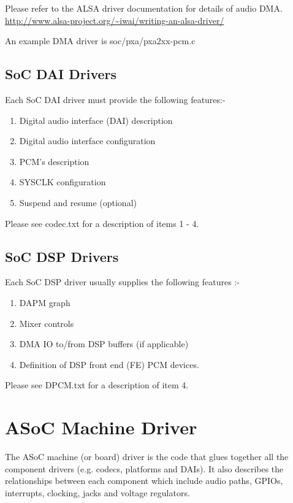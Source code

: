 \documentclass[a4paper,8pt,english]{sphinxmanual}
\begin{document}
Please refer to the ALSA driver documentation for details of audio DMA.
\href{http://www.alsa-project.org/~iwai/writing-an-alsa-driver/}{http://www.alsa-project.org/\textasciitilde{}iwai/writing-an-alsa-driver/}

An example DMA driver is soc/pxa/pxa2xx-pcm.c


\subsection{SoC DAI Drivers}
\label{sound/soc/platform:soc-dai-drivers}
Each SoC DAI driver must provide the following features:-
\begin{enumerate}
\item {} 
Digital audio interface (DAI) description

\item {} 
Digital audio interface configuration

\item {} 
PCM's description

\item {} 
SYSCLK configuration

\item {} 
Suspend and resume (optional)

\end{enumerate}

Please see codec.txt for a description of items 1 - 4.


\subsection{SoC DSP Drivers}
\label{sound/soc/platform:soc-dsp-drivers}
Each SoC DSP driver usually supplies the following features :-
\begin{enumerate}
\item {} 
DAPM graph

\item {} 
Mixer controls

\item {} 
DMA IO to/from DSP buffers (if applicable)

\item {} 
Definition of DSP front end (FE) PCM devices.

\end{enumerate}

Please see DPCM.txt for a description of item 4.


\section{ASoC Machine Driver}
\label{sound/soc/machine:asoc-machine-driver}\label{sound/soc/machine::doc}
The ASoC machine (or board) driver is the code that glues together all the
component drivers (e.g. codecs, platforms and DAIs). It also describes the
relationships between each component which include audio paths, GPIOs,
interrupts, clocking, jacks and voltage regulators.
\end{document}
